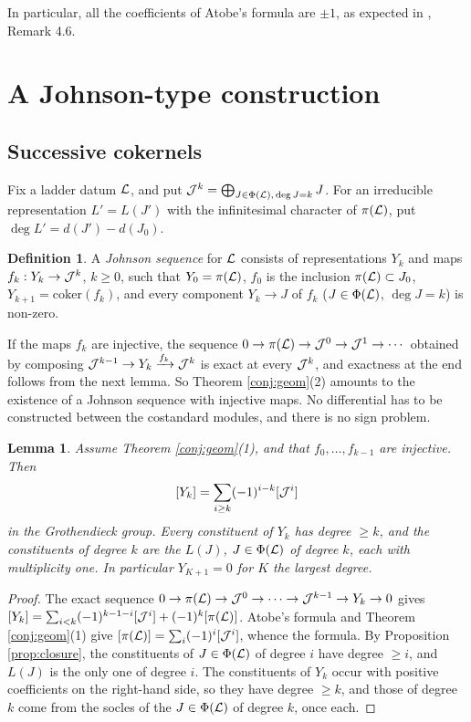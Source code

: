 \documentclass[a4paper,12pt,leqno]{amsart}
\theoremstyle{plain}
\newtheorem{lemma}[thm]{Lemma}
\theoremstyle{definition}
\newtheorem{defi}[thm]{Definition}
\begin{document}
\noindent In particular, all the coefficients of Atobe's formula are $\pm1$, as expected in
\cite{Ato24}, Remark 4.6.

\section{A Johnson-type construction}\label{sec:johnson}

\subsection{Successive cokernels}\label{ssec:cokernels}
Fix a ladder datum $\mathcal{L}$, and put $\mathcal{J}^k=\bigoplus_{J\in\Phi(\mathcal{L}),\,\deg J=k}J$. For an irreducible
representation $L'=L(J')$ with the infinitesimal character of $\pi(\mathcal{L})$, put $\deg L'=d(J')-d(J_0)$.

\begin{defi} A \emph{Johnson sequence} for $\mathcal{L}$ consists of representations $Y_k$ and maps
$f_k:Y_k\to\mathcal{J}^k$, $k\geq0$, such that $Y_0=\pi(\mathcal{L})$, $f_0$ is the inclusion $\pi(\mathcal{L})\subset J_0$,
$Y_{k+1}=\mathrm{coker}(f_k)$, and every component $Y_k\to J$ of $f_k$ ($J\in\Phi(\mathcal{L})$, $\deg J=k$) is non-zero.
\end{defi}

\noindent If the maps $f_k$ are injective, the sequence
$0\to\pi(\mathcal{L})\to\mathcal{J}^0\to\mathcal{J}^1\to\cdots$ obtained by composing $\mathcal{J}^{k-1}\to Y_k\xrightarrow{f_k}\mathcal{J}^k$ is
exact at every $\mathcal{J}^k$, and exactness at the end follows from the next lemma. So Theorem
\ref{conj:geom}(2) amounts to the existence of a Johnson sequence with injective maps. No differential
has to be constructed between the costandard modules, and there is no sign problem.

\begin{lemma}\label{lem:bookkeeping} Assume Theorem \ref{conj:geom}(1), and that
$f_0,\ldots,f_{k-1}$ are injective. Then
\[[Y_k]=\sum_{i\geq k}(-1)^{i-k}[\mathcal{J}^i]\]
in the Grothendieck group. Every constituent of $Y_k$ has degree $\geq k$, and the constituents of
degree $k$ are the $L(J)$, $J\in\Phi(\mathcal{L})$ of degree $k$, each with multiplicity one. In particular $Y_{K+1}=0$ for $K$ the
largest degree.
\end{lemma}

\begin{proof}
The exact sequence $0\to\pi(\mathcal{L})\to\mathcal{J}^0\to\cdots\to\mathcal{J}^{k-1}\to Y_k\to0$ gives
$[Y_k]=\sum_{i<k}(-1)^{k-1-i}[\mathcal{J}^i]+(-1)^k[\pi(\mathcal{L})]$. Atobe's formula and Theorem
\ref{conj:geom}(1) give $[\pi(\mathcal{L})]=\sum_i(-1)^i[\mathcal{J}^i]$, whence the formula. By Proposition
\ref{prop:closure}, the constituents of $J\in\Phi(\mathcal{L})$ of degree $i$ have degree $\geq i$, and $L(J)$ is the only one of
degree $i$. The constituents of $Y_k$ occur with positive coefficients on the right-hand side, so they
have degree $\geq k$, and those of degree $k$ come from the socles of the $J\in\Phi(\mathcal{L})$ of degree $k$, once each.
\end{proof}
\end{document}
